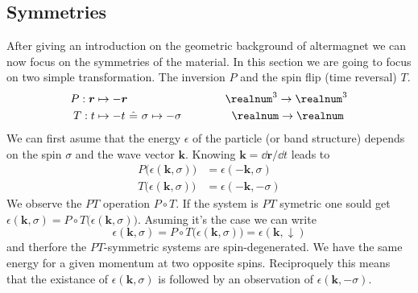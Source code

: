 \documentclass[../main.tex]{main.tex}
\begin{document}
\subsection{Symmetries}
After giving an introduction on the geometric background of altermagnet we can now focus on the symmetries of the material. In this section
we are going to focus on two simple transformation. The inversion $P$ and the spin flip (time reversal) $T$.
\begin{alignat*}{2}
    P : \bm{r} &\mapsto -\bm{r} ~~~~~~~~~~~~~~~~~~~~ &~~~\realnum^3 \rightarrow \realnum^3 \\
    T : t &\mapsto -t  ~\hat{=} ~\sigma \mapsto -\sigma &\realnum \rightarrow \realnum~
\end{alignat*}
We can first asume that the energy $\epsilon$ of the particle (or band structure) depends on the spin $\sigma$ and the wave vector $\bm{k}$. Knowing 
$\bm{k} = \dd \bm{r}/\dd t$ leads to 
\begin{align*}
    P \bigl(\epsilon(\bm{k}, \sigma)\bigr) &= \epsilon(-\bm{k}, \sigma)\\
    T \bigl(\epsilon(\bm{k}, \sigma)\bigr) &= \epsilon(-\bm{k}, -\sigma)
\end{align*}
We observe the $PT$ operation $P\circ T$. If the system is $PT$ symetric one sould get $\epsilon(\bm{k}, \sigma)= P\circ T\bigl(\epsilon(\bm{k}, \sigma)\bigr)$.
Asuming it's the case we can write
\[
    \epsilon(\bm{k}, \sigma)= P\circ T\bigl(\epsilon(\bm{k}, \sigma)\bigr) =  \epsilon(\bm{k}, \downarrow)
\] 
and therfore the $PT$-symmetric systems are spin-degenerated. We have the same energy for a given momentum at two opposite spins.
 Reciproquely this means that the existance 
of $ \epsilon(\bm{k}, \sigma)$ is followed by an observation of $ \epsilon(\bm{k}, -\sigma)$.\\
\end{document}
